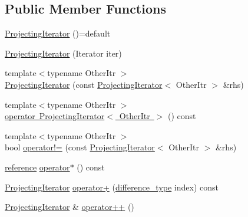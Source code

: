 \subsection*{Public Member Functions}
\begin{DoxyCompactItemize}
\item 
\mbox{\hyperlink{classstanfordcpplib_1_1collections_1_1ProjectingIterator_a60acfb23e909aa65b34e65f39d907de1}{Projecting\+Iterator}} ()=default
\item 
\mbox{\hyperlink{classstanfordcpplib_1_1collections_1_1ProjectingIterator_aeb857d20dedbc3739da8a2f8b1afdcdd}{Projecting\+Iterator}} (Iterator iter)
\item 
{\footnotesize template$<$typename Other\+Itr $>$ }\\\mbox{\hyperlink{classstanfordcpplib_1_1collections_1_1ProjectingIterator_a8affbc93b588e43dbd4ce5d8d9f01873}{Projecting\+Iterator}} (const \mbox{\hyperlink{classstanfordcpplib_1_1collections_1_1ProjectingIterator}{Projecting\+Iterator}}$<$ Other\+Itr $>$ \&rhs)
\item 
{\footnotesize template$<$typename Other\+Itr $>$ }\\\mbox{\hyperlink{classstanfordcpplib_1_1collections_1_1ProjectingIterator_a66c6796364d5f51076280388342fd5ab}{operator Projecting\+Iterator$<$ Other\+Itr $>$}} () const
\item 
{\footnotesize template$<$typename Other\+Itr $>$ }\\bool \mbox{\hyperlink{classstanfordcpplib_1_1collections_1_1ProjectingIterator_a0b2e08200163f345c36d2ac8fed8dc13}{operator!=}} (const \mbox{\hyperlink{classstanfordcpplib_1_1collections_1_1ProjectingIterator}{Projecting\+Iterator}}$<$ Other\+Itr $>$ \&rhs)
\item 
\mbox{\hyperlink{classstanfordcpplib_1_1collections_1_1ProjectingIterator_ab734e7d93a20160ecd4ee87cec8336af}{reference}} \mbox{\hyperlink{classstanfordcpplib_1_1collections_1_1ProjectingIterator_ab086ec1916db61d1ab56a801abca8d91}{operator$\ast$}} () const
\item 
\mbox{\hyperlink{classstanfordcpplib_1_1collections_1_1ProjectingIterator}{Projecting\+Iterator}} \mbox{\hyperlink{classstanfordcpplib_1_1collections_1_1ProjectingIterator_abf28dd6a9b03bdd0c7755af4a0f87af0}{operator+}} (\mbox{\hyperlink{classstanfordcpplib_1_1collections_1_1ProjectingIterator_ad050e8e82b0962bb9ebd0e7c23b436ac}{difference\+\_\+type}} index) const
\item 
\mbox{\hyperlink{classstanfordcpplib_1_1collections_1_1ProjectingIterator}{Projecting\+Iterator}} \& \mbox{\hyperlink{classstanfordcpplib_1_1collections_1_1ProjectingIterator_a00a207328b669f24a248a084b1bf60e6}{operator++}} ()

\end{DoxyCompactItemize}
